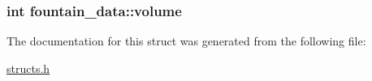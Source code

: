 \hypertarget{structfountain__data_ac08752e636ab5a427ff7d7ac83183bd9}{
\subsubsection[{volume}]{\setlength{\rightskip}{0pt plus 5cm}int fountain\-\_\-data\-::volume}}\label{structfountain__data_ac08752e636ab5a427ff7d7ac83183bd9}


The documentation for this struct was generated from the following file\-:\begin{DoxyCompactItemize}
\item 
\hyperlink{structs_8h}{structs.\-h}\end{DoxyCompactItemize}
